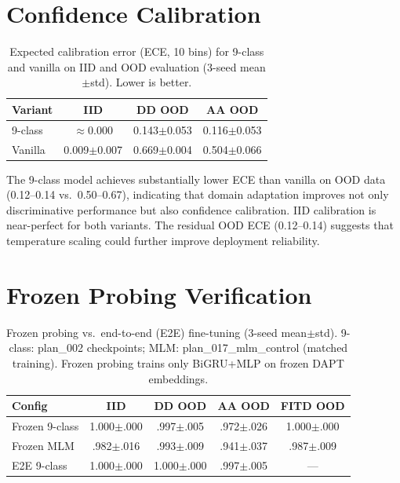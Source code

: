 \section{Confidence Calibration}
\label{app:calibration}

\begin{table}[ht]
\centering
\footnotesize
\caption{Expected calibration error (ECE, 10 bins) for 9-class and vanilla on IID and OOD evaluation (3-seed mean$\pm$std). Lower is better.}
\label{tab:calibration}
\begin{tabular}{@{}lccc@{}}
\toprule
\textbf{Variant} & IID & DD OOD & AA OOD \\
\midrule
9-class & $\approx$0.000 & 0.143$\pm$0.053 & 0.116$\pm$0.053 \\
Vanilla & 0.009$\pm$0.007 & 0.669$\pm$0.004 & 0.504$\pm$0.066 \\
\bottomrule
\end{tabular}
\end{table}

The 9-class model achieves substantially lower ECE than vanilla on OOD data (0.12--0.14 vs.\ 0.50--0.67), indicating that domain adaptation improves not only discriminative performance but also confidence calibration. IID calibration is near-perfect for both variants. The residual OOD ECE (0.12--0.14) suggests that temperature scaling could further improve deployment reliability.

\section{Frozen Probing Verification}
\label{app:frozen_verify}

\begin{table}[ht]
\centering
\footnotesize
\caption{Frozen probing vs.\ end-to-end (E2E) fine-tuning (3-seed mean$\pm$std). 9-class: plan\_002 checkpoints; MLM: plan\_017\_mlm\_control (matched training). Frozen probing trains only BiGRU+MLP on frozen DAPT embeddings.}
\label{tab:frozen_verify}
\begin{tabular}{@{}lcccc@{}}
\toprule
\textbf{Config} & IID & DD OOD & AA OOD & FITD OOD \\
\midrule
Frozen 9-class & 1.000$\pm$.000 & .997$\pm$.005 & .972$\pm$.026 & 1.000$\pm$.000 \\
Frozen MLM & .982$\pm$.016 & .993$\pm$.009 & .941$\pm$.037 & .987$\pm$.009 \\
E2E 9-class & 1.000$\pm$.000 & 1.000$\pm$.000 & .997$\pm$.005 & --- \\
\bottomrule
\end{tabular}
\end{table}

